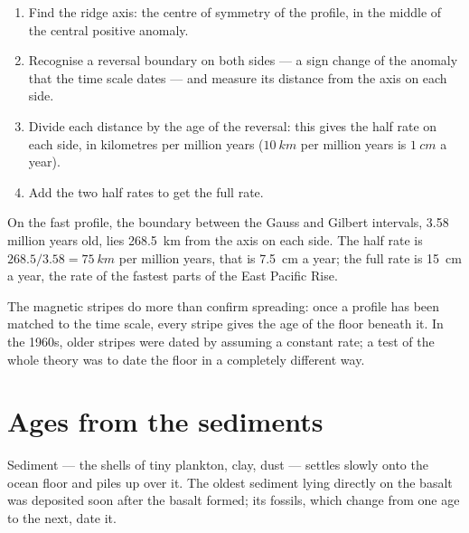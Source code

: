 \begin{method}\label{met:g11:drift-to-spreading:rate}
\begin{enumerate}
  \item Find the ridge axis: the centre of symmetry of the profile, in the
        middle of the central positive anomaly.
  \item Recognise a reversal boundary on both sides --- a sign change of the
        anomaly that the time scale dates --- and measure its distance from
        the axis on each side.
  \item Divide each distance by the age of the reversal: this gives the half
        rate on each side, in kilometres per million years
        ($\qty{10}{km}$ per million years is $\qty{1}{cm}$ a year).
  \item Add the two half rates to get the full rate.
\end{enumerate}
\end{method}

\begin{example}\label{ex:g11:drift-to-spreading:fast}
On the fast profile, the boundary between the Gauss and Gilbert intervals,
\num{3.58} million years old, lies \qty{268.5}{km} from the axis on each side.
The half rate is $268.5/3.58 = \qty{75}{km}$ per million years, that is
\qty{7.5}{cm} a year; the full rate is \qty{15}{cm} a year, the rate of the
fastest parts of the East Pacific Rise.
\end{example}

The magnetic stripes do more than confirm spreading: once a profile has been
matched to the time scale, every stripe gives the age of the floor beneath it.
In the 1960s, older stripes were dated by assuming a constant rate; a test of
the whole theory was to date the floor in a completely different way.

\section{Ages from the sediments}

Sediment --- the shells of tiny plankton, clay, dust --- settles slowly onto
the ocean floor and piles up over it. The oldest sediment lying directly on
the basalt was deposited soon after the basalt formed; its fossils, which
change from one age to the next, date it.

